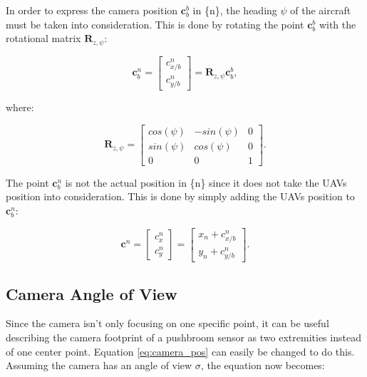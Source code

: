In order to express the camera position $\bm{c}_b^b$ in \{n\}, the heading $\psi$ of the aircraft must be taken into consideration. This is done by rotating the point $\bm{c}_b^b$ with the rotational matrix $\bm{R}_{z,\psi}$:

\begin{equation} \label{eq:body_ned_rotate}
	\bm{c}_b^n =
	\begin{bmatrix}
		c_{x/b}^n \\
		c_{y/b}^n
	\end{bmatrix}
	= \bm{R}_{z,\psi} \bm{c}_b^b,
\end{equation}

where:

\begin{equation}
	\bm{R}_{z,\psi} = 
	\begin{bmatrix}
		cos(\psi) & -sin(\psi) & 0 \\
		sin(\psi) & cos(\psi) & 0 \\
		0 & 0 & 1
	\end{bmatrix}.
\end{equation}

The point $\bm{c}_b^n$ is not the actual position in \{n\} since it does not take the UAVs position into consideration. This is done by simply adding the UAVs position to $\bm{c}_b^n$:

\begin{equation} \label{eq:body_ned_trans}
	\bm{c}^n =
	\begin{bmatrix}
		c_x^n \\ c_y^n
	\end{bmatrix}
	=
	\begin{bmatrix}
		x_n + c_{x/b}^n \\
		y_n + c_{y/b}^n
	\end{bmatrix}.
\end{equation}

\subsection{Camera Angle of View}
Since the camera isn't only focusing on one specific point, it can be useful describing the camera footprint of a pushbroom sensor as two extremities instead of one center point. Equation \eqref{eq:camera_pos} can easily be changed to do this. Assuming the camera has an angle of view $\sigma$, the equation now becomes:

